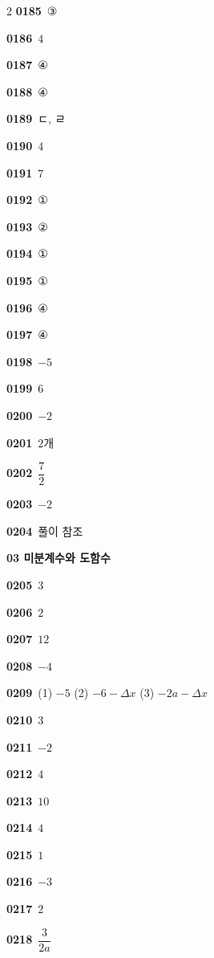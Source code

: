 \documentclass[10pt,a4paper]{article}
\begin{document}
\begin{multicols}{2}
\noindent\textbf{0185}\ ③\par
\noindent\textbf{0186}\ $4$\par
\noindent\textbf{0187}\ ④\par
\noindent\textbf{0188}\ ④\par
\noindent\textbf{0189}\ ㄷ, ㄹ\par
\noindent\textbf{0190}\ $4$\par
\noindent\textbf{0191}\ $7$\par
\noindent\textbf{0192}\ ①\par
\noindent\textbf{0193}\ ②\par
\noindent\textbf{0194}\ ①\par
\noindent\textbf{0195}\ ①\par
\noindent\textbf{0196}\ ④\par
\noindent\textbf{0197}\ ④\par
\noindent\textbf{0198}\ $-5$\par
\noindent\textbf{0199}\ $6$\par
\noindent\textbf{0200}\ $-2$\par
\noindent\textbf{0201}\ $2$개\par
\noindent\textbf{0202}\ $\dfrac{7}{2}$\par
\noindent\textbf{0203}\ $-2$\par
\noindent\textbf{0204}\ 풀이 참조\par
\noindent\textbf{03 미분계수와 도함수}\par\smallskip
\noindent\textbf{0205}\ $3$\par
\noindent\textbf{0206}\ $2$\par
\noindent\textbf{0207}\ $12$\par
\noindent\textbf{0208}\ $-4$\par
\noindent\textbf{0209}\ (1) $-5$ \quad (2) $-6-\varDelta x$ \quad (3) $-2a-\varDelta x$\par
\noindent\textbf{0210}\ $3$\par
\noindent\textbf{0211}\ $-2$\par
\noindent\textbf{0212}\ $4$\par
\noindent\textbf{0213}\ $10$\par
\noindent\textbf{0214}\ $4$\par
\noindent\textbf{0215}\ $1$\par
\noindent\textbf{0216}\ $-3$\par
\noindent\textbf{0217}\ $2$\par
\noindent\textbf{0218}\ $\dfrac{3}{2a}$\par

\end{multicols}
\end{document}
